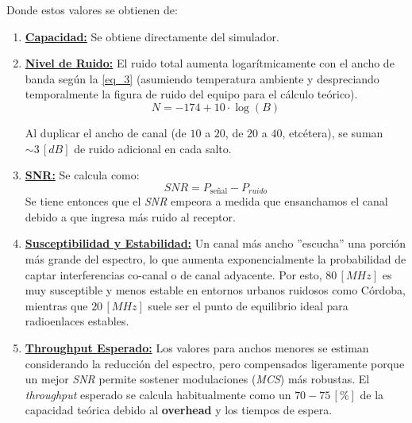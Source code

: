 Donde estos valores se obtienen de:
\begin{enumerate}
    \item \textbf{\underline{Capacidad:}} Se obtiene directamente del simulador.

    \item \textbf{\underline{Nivel de Ruido:}} El ruido total aumenta logarítmicamente con el ancho de banda según la \autoref{eq_3} (asumiendo temperatura ambiente y despreciando temporalmente la figura de ruido del equipo para el cálculo teórico). \cite{b2}
    \begin{equation}
        N = -174 + 10 \cdot \log(B)
        \label{eq_3}
    \end{equation}
    
    Al duplicar el ancho de canal (de $10$ a $20$, de $20$ a $40$, etcétera), se suman $\sim 3 \, [dB]$ de ruido adicional en cada salto.
    \item \textbf{\underline{SNR:}} Se calcula como:
    \begin{equation}
        SNR = P_{\text{señal}} - P_{ruido}
        \label{eq_4}
    \end{equation}
    Se tiene entonces que el \textit{SNR} empeora a medida que ensanchamos el canal debido a que ingresa más ruido al receptor.

    \item \textbf{\underline{Susceptibilidad y Estabilidad:}} Un canal más ancho ''escucha'' una porción más grande del espectro, lo que aumenta exponencialmente la probabilidad de captar interferencias co-canal o de canal adyacente. Por esto, $80 \, [MHz]$ es muy susceptible y menos estable en entornos urbanos ruidosos como Córdoba, mientras que $20 \, [MHz]$ suele ser el punto de equilibrio ideal para radioenlaces estables.

    \item \textbf{\underline{Throughput Esperado:}} Los valores para anchos menores se estiman considerando la reducción del espectro, pero compensados ligeramente porque un mejor \textit{SNR} permite sostener modulaciones (\textit{MCS}) más robustas. El \textit{throughput} esperado se calcula habitualmente como un $70 - 75 \, [\%]$ de la capacidad teórica debido al \textbf{overhead} y los tiempos de espera.
\end{enumerate}

